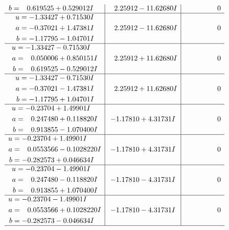 \documentclass[1p]{elsarticle_modified}
\theoremstyle{definition}
\begin{document}
$$\begin{array}{c|c|c}
\begin{aligned}
b &= \phantom{-}0.619525 + 0.529012 I\end{aligned}
 & \phantom{-}2.25912 - 11.62680 I & \phantom{-0.000000 } 0 \\ \hline\begin{aligned}
u &= -1.33427 + 0.71530 I \\
a &= -0.37021 + 1.47381 I \\
b &= -1.17795 - 1.04701 I\end{aligned}
 & \phantom{-}2.25912 - 11.62680 I & \phantom{-0.000000 } 0 \\ \hline\begin{aligned}
u &= -1.33427 - 0.71530 I \\
a &= \phantom{-}0.050006 + 0.850151 I \\
b &= \phantom{-}0.619525 - 0.529012 I\end{aligned}
 & \phantom{-}2.25912 + 11.62680 I & \phantom{-0.000000 } 0 \\ \hline\begin{aligned}
u &= -1.33427 - 0.71530 I \\
a &= -0.37021 - 1.47381 I \\
b &= -1.17795 + 1.04701 I\end{aligned}
 & \phantom{-}2.25912 + 11.62680 I & \phantom{-0.000000 } 0 \\ \hline\begin{aligned}
u &= -0.23704 + 1.49901 I \\
a &= \phantom{-}0.247480 + 0.118820 I \\
b &= \phantom{-}0.913855 - 1.070400 I\end{aligned}
 & -1.17810 + 4.31731 I & \phantom{-0.000000 } 0 \\ \hline\begin{aligned}
u &= -0.23704 + 1.49901 I \\
a &= \phantom{-}0.0553566 - 0.1028220 I \\
b &= -0.282573 + 0.046634 I\end{aligned}
 & -1.17810 + 4.31731 I & \phantom{-0.000000 } 0 \\ \hline\begin{aligned}
u &= -0.23704 - 1.49901 I \\
a &= \phantom{-}0.247480 - 0.118820 I \\
b &= \phantom{-}0.913855 + 1.070400 I\end{aligned}
 & -1.17810 - 4.31731 I & \phantom{-0.000000 } 0 \\ \hline\begin{aligned}
u &= -0.23704 - 1.49901 I \\
a &= \phantom{-}0.0553566 + 0.1028220 I \\
b &= -0.282573 - 0.046634 I\end{aligned}
 & -1.17810 - 4.31731 I & \phantom{-0.000000 } 0\\
 \hline 
 \end{array}$$\newpage\newpage\renewcommand{\arraystretch}{1}
\end{document}
